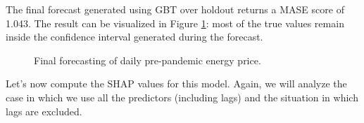 The final forecast generated using GBT over holdout returns a MASE score of 1.043. The result can be visualized in Figure \ref{fig:forecast-daily-pre}: most of the true values remain inside the confidence interval generated during the forecast.

\begin{figure}[H]
\centering
    \caption{Final forecasting of daily pre-pandemic energy price.}
    \label{fig:forecast-daily-pre}
\end{figure}

Let's now compute the SHAP values for this model. Again, we will analyze the case in which we use all the predictors (including lags) and the situation in which lags are excluded.

